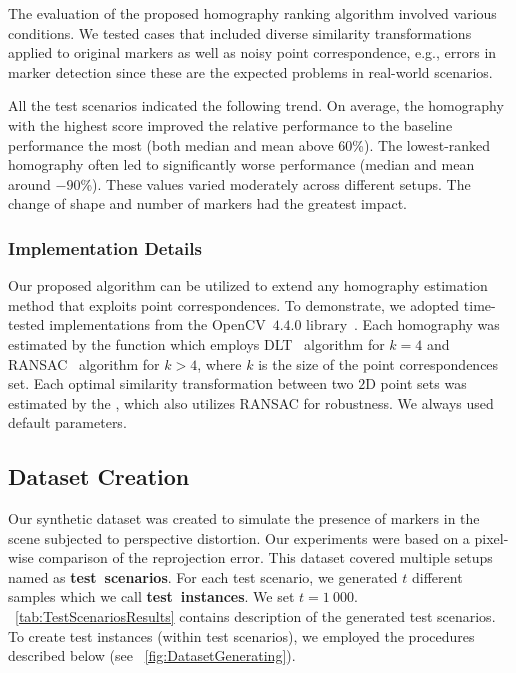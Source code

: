 The evaluation of the proposed homography ranking algorithm involved various conditions. We tested cases that included diverse similarity transformations applied to original markers as well as noisy point correspondence, e.g., errors in marker detection since these are the expected problems in real-world scenarios.

All the test scenarios indicated the following trend. On average, the homography with the highest score improved the relative performance to the baseline performance the most (both median and mean above $60$\%). The lowest-ranked homography often led to significantly worse performance (median and mean around $-90$\%). These values varied moderately across different setups. The change of shape and number of markers had the greatest impact.

\subsubsection{Implementation Details}
\label{sssec:HomographyImplementation}

Our proposed algorithm can be utilized to extend any homography estimation method that exploits point correspondences. To demonstrate, we adopted time-tested implementations from the OpenCV~$4.4.0$ library~\cite{bradski2008learning}. Each homography was estimated by the  function which employs DLT~\cite{abdel2015direct} algorithm for $k = 4$ and RANSAC~\cite{fischler1981ransac} algorithm for $k > 4$, where $k$ is the size of the point correspondences set. Each optimal similarity transformation between two $2$D point sets was estimated by the , which also utilizes RANSAC for robustness. We always used default parameters.

\subsection{Dataset Creation}
\label{ssec:HomographyDatasetCreation}

Our synthetic dataset was created to simulate the presence of markers in the scene subjected to perspective distortion. Our experiments were based on a pixel-wise comparison of the reprojection error. This dataset covered multiple setups named as \mbox{\textbf{test scenarios}}. For each test scenario, we generated $t$ different samples which we call \mbox{\textbf{test instances}}. We set $t = 1\ 000$. \tablestr{}~\ref{tab:TestScenariosResults} contains description of the generated test scenarios. To create test instances (within test scenarios), we employed the procedures described below (see \figstr{}~\ref{fig:DatasetGenerating}).

